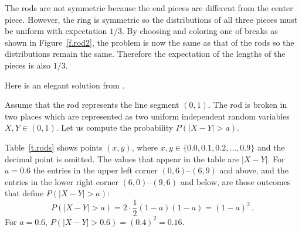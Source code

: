 The rods are not symmetric because the end pieces are different from the center piece. However, the ring is symmetric so the distributions of all three pieces must be uniform with expectation $1/3$. By choosing and coloring one of breaks as shown in Figure~\ref{f.rod2}, the problem is now the same as that of the rods so the distributions remain the same. Therefore the expectation of the lengths of the pieces is also $1/3$.


Here is an elegant solution from \cite{stack-rods}.

Assume that the rod represents the line segment $(0,1)$. The rod is broken in two places which are represented as two uniform independent random variables $X,Y\in (0,1)$. Let us compute the probability $P(|X-Y|>a)$.

Table~\ref{t.rods} shows points $(x,y)$, where $x,y \in \{0.0, 0.1, 0.2, \ldots, 0.9\}$ and the decimal point is omitted. The values that appear in the table are $|X-Y|$. For $a=0.6$ the entries in the upper left corner $(0,6)$--$(6,9)$ and above, and the entries in the lower right corner $(6,0)$--$(9,6)$ and below, are those outcomes that define $P(|X-Y|>a)$:
\[
P(|X-Y|>a)=2\cdot \frac{1}{2}(1-a)(1-a)=(1-a)^2\,.
\]
For $a=0.6$, $P(|X-Y|>0.6)=(0.4)^2=0.16$.

